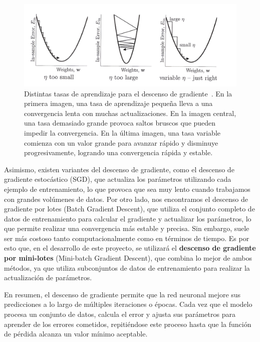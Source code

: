 \begin{figure}[h]
    \centering
    \includegraphics[width=0.9\linewidth]{img/gradientdescent.png}
    \caption[Distintas tasas de aprendizaje para el descenso de gradiente~\cite{Mostafa2012}.]{Distintas tasas de aprendizaje para el descenso de gradiente~\cite{Mostafa2012}. En la primera imagen, una tasa de aprendizaje pequeña lleva a una convergencia lenta con muchas actualizaciones. En la imagen central, una tasa demasiado grande provoca saltos bruscos que pueden impedir la convergencia. En la última imagen, una tasa variable comienza con un valor grande para avanzar rápido y disminuye progresivamente, logrando una convergencia rápida y estable.}\label{fig:gradientdescent}
\end{figure}

Asimismo, existen variantes del descenso de gradiente, como el descenso de gradiente estocástico (SGD), que actualiza los parámetros utilizando cada ejemplo de entrenamiento, lo que provoca que sea muy lento cuando trabajamos con grandes volúmenes de datos. Por otro lado, nos encontramos el descenso de gradiente por lotes (Batch Gradient Descent), que utiliza el conjunto completo de datos de entrenamiento para calcular el gradiente y actualizar los parámetros, lo que permite realizar una convergencia más estable y precisa. Sin embargo, suele ser más costoso tanto computacionalmente como en términos de tiempo. Es por esto que, en el desarrollo de este proyecto, se utilizará el \textbf{descenso de gradiente por mini-lotes} (Mini-batch Gradient Descent), que combina lo mejor de ambos métodos, ya que utiliza subconjuntos de datos de entrenamiento para realizar la actualización de parámetros.

En resumen, el descenso de gradiente permite que la red neuronal mejore sus predicciones a lo largo de múltiples iteraciones o épocas. Cada vez que el modelo procesa un conjunto de datos, calcula el error y ajusta sus parámetros para aprender de los errores cometidos, repitiéndose este proceso hasta que la función de pérdida alcanza un valor mínimo aceptable.


